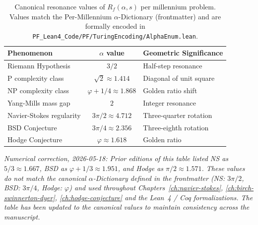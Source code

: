 \begin{center}
\begin{table}[h]
\centering
\begin{tabular}{|l|c|l|}
\hline
\textbf{Phenomenon} & \textbf{$\alpha$ value} & \textbf{Geometric Significance} \\
\hline
Riemann Hypothesis & $3/2$ & Half-step resonance \\
P complexity class & $\sqrt{2} \approx 1.414$ & Diagonal of unit square \\
NP complexity class & $\varphi + 1/4 \approx 1.868$ & Golden ratio shift \\
Yang-Mills mass gap & $2$ & Integer resonance \\
Navier-Stokes regularity & $3\pi/2 \approx 4.712$ & Three-quarter rotation \\
BSD Conjecture & $3\pi/4 \approx 2.356$ & Three-eighth rotation \\
Hodge Conjecture & $\varphi \approx 1.618$ & Golden ratio \\
\hline
\end{tabular}
\caption{Canonical resonance values of $R_f(\alpha, s)$ per millennium problem. Values match the Per-Millennium $\alpha$-Dictionary (frontmatter) and are formally encoded in \texttt{PF\_Lean4\_Code/PF/TuringEncoding/AlphaEnum.lean}.}
\label{tab:resonance-values}
\end{table}
\end{center}

\medskip
\noindent\emph{Numerical correction, 2026-05-18: Prior editions of this table listed NS as $5/3 \approx 1.667$, BSD as $\varphi + 1/3 \approx 1.951$, and Hodge as $\pi/2 \approx 1.571$. These values do not match the canonical $\alpha$-Dictionary defined in the frontmatter (NS: $3\pi/2$, BSD: $3\pi/4$, Hodge: $\varphi$) and used throughout Chapters~\ref{ch:navier-stokes}, \ref{ch:birch-swinnerton-dyer}, \ref{ch:hodge-conjecture} and the Lean~4 / Coq formalizations. The table has been updated to the canonical values to maintain consistency across the manuscript.}


